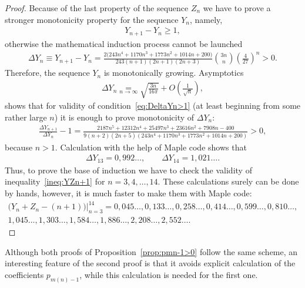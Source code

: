 \documentclass[pdftex]{sigma}
\numberwithin{equation}{section}
\begin{document}
\begin{proof}
Because of the last property of the sequence $Z_n$ we have to prove a stronger monotonicity property for the
sequence $Y_n$, namely,
\begin{gather}\label{eq:DeltaYn>1}
Y_{n+1}-Y_n\geq1,
\end{gather}
otherwise the mathematical induction process cannot be launched
\begin{gather*}
\Delta Y_n\equiv Y_{n+1}-Y_n=\frac{2\big(243n^4+1170n^3+1773n^2+1014n+200\big)}{243(n+1)(2n+1)(2n+3)}\binom{3n}{n}\left(\frac{4}{27}\right)^n>0.
\end{gather*}
Therefore, the sequence $Y_n$ is monotonically growing. Asymptotics
\begin{gather*}
\Delta Y_n\underset{n\to\infty}=\sqrt{\frac{3n}{16\pi}}+O\left(\frac{1}{\sqrt{n}}\right),
\end{gather*}
shows that for validity of condition~\eqref{eq:DeltaYn>1} (at least beginning from some rather large $n$)
it is enough to prove monotonicity of $\Delta Y_n$:
\begin{gather*}
\frac{\Delta Y_{n+1}}{\Delta Y_n}-1=
\frac{2187n^5+12312n^4+25497n^3+23616n^2+7908n-400}{9(n+2)(2n+5)(243n^4+1170n^3+1773n^2+1014n+200)}>0,
\end{gather*}
because $n>1$. Calculation with the help of Maple code shows that
\begin{gather*}
\Delta Y_{13}=0,992\ldots,\qquad\Delta Y_{14}=1,021\ldots.
\end{gather*}
Thus, to prove the base of induction we have to check the validity of inequality~\eqref{ineq:YZn+1} for
$n=3,4,\ldots,14$. These calculations surely can be done by hands, however, it is much faster to make them
with Maple code:
\begin{gather*}
\big(Y_n+Z_n-(n+1)\big)\Big\vert_{n=3}^{14}=0,045\ldots, 0,133\ldots, 0,258\ldots, 0,414\ldots, 0,599\ldots,0,810\ldots,\\
1,045\ldots, 1,303\ldots, 1,584\ldots, 1,886\ldots, 2,208\ldots, 2,552\ldots.\tag*{\qed}
\end{gather*}\renewcommand{\qed}{}
\end{proof}
\begin{Remark}Although both proofs of Proposition~\ref{prop:pmn-1>0} follow the same scheme, an interesting feature of the second proof
is that it avoids explicit calculation of the coefficients $p_{m(n)-1}$, while this calculation is needed for the first one.
\end{Remark}
\end{document}
